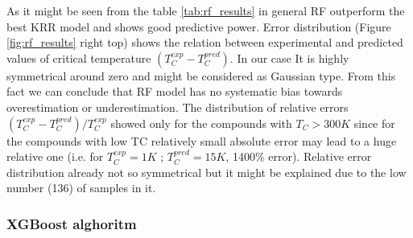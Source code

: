 As it might be seen from the table \ref{tab:rf_results} in general RF outperform the best KRR model and shows good predictive power. Error distribution (Figure \ref{fig:rf_results} right top) shows the relation between experimental and predicted values of critical temperature $(T_C^{exp} - T_C^{pred})$. In our case It is highly symmetrical around zero and might be considered as Gaussian type. From this fact we can conclude that RF model has no systematic bias towards overestimation or underestimation. The distribution of relative errors $(T_C^{exp} - T_C^{pred}) / T_C^{exp}$ showed only for the compounds with $T_C>300K$ since for the compounds with low TC relatively small absolute error may lead to a huge relative one (i.e. for $T_C^{exp} = 1 K$ ; $T_C^{pred} = 15 K$, 1400\% error). Relative error distribution already not so symmetrical but it might be explained due to the low number (136) of samples in it.

\subsubsection{XGBoost alghoritm}
\label{section: XGBoost}

